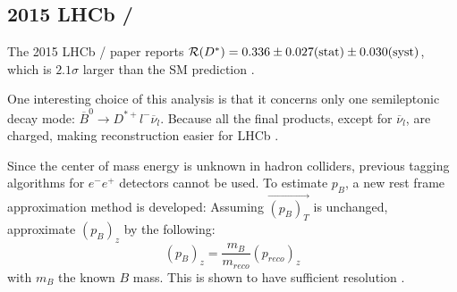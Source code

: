 \subsection{2015 LHCb \RDst/}
The 2015 LHCb \RDst/ paper reports
$\RDst/ = 0.336 \pm 0.027 \text{(stat)} \pm 0.030 \text{(syst)}$, which is
$2.1 \sigma$ larger than the SM prediction \cite{LHCb:PhysRevLett.115.111803}.

One interesting choice of this analysis is that it concerns only one
semileptonic decay mode:
$\overline{B}^0 \longrightarrow D^{*+} l^- \overline{\nu}_l$.
Because all the final products, except for $\overline{\nu}_l$, are charged,
making reconstruction easier for LHCb \cite{LHCb:PhysRevLett.115.111803}.

Since the center of mass energy is unknown in hadron colliders, previous tagging
algorithms for $e^- e^+$ detectors cannot be used.
To estimate $p_{B}$, a new rest frame approximation method is developed:
Assuming $\vec{(p_{B})_T}$ is unchanged, approximate $(p_{B})_z$ by the
following:
\begin{equation*}
    (p_{B})_z = \frac{m_B}{m_{reco}} (p_{reco})_z
\end{equation*}
with $m_B$ the known $B$ mass.
This is shown to have sufficient resolution \cite{LHCb:PhysRevLett.115.111803}.
